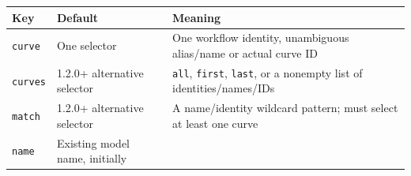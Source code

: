 \documentclass[
  10pt,
  a4paper,
  oneside]{scrreprt}
\begin{document}
\begin{longtable}[]{@{}lll@{}}
\toprule
\begin{minipage}[b]{0.30\columnwidth}\raggedright
Key\strut
\end{minipage} & \begin{minipage}[b]{0.30\columnwidth}\raggedright
Default\strut
\end{minipage} & \begin{minipage}[b]{0.30\columnwidth}\raggedright
Meaning\strut
\end{minipage}\tabularnewline
\midrule
\endhead
\begin{minipage}[t]{0.30\columnwidth}\raggedright
\texttt{curve}\strut
\end{minipage} & \begin{minipage}[t]{0.30\columnwidth}\raggedright
One selector\strut
\end{minipage} & \begin{minipage}[t]{0.30\columnwidth}\raggedright
One workflow identity, unambiguous alias/name or actual curve ID\strut
\end{minipage}\tabularnewline
\begin{minipage}[t]{0.30\columnwidth}\raggedright
\texttt{curves}\strut
\end{minipage} & \begin{minipage}[t]{0.30\columnwidth}\raggedright
1.2.0+ alternative selector\strut
\end{minipage} & \begin{minipage}[t]{0.30\columnwidth}\raggedright
\texttt{all}, \texttt{first}, \texttt{last}, or a nonempty list of
identities/names/IDs\strut
\end{minipage}\tabularnewline
\begin{minipage}[t]{0.30\columnwidth}\raggedright
\texttt{match}\strut
\end{minipage} & \begin{minipage}[t]{0.30\columnwidth}\raggedright
1.2.0+ alternative selector\strut
\end{minipage} & \begin{minipage}[t]{0.30\columnwidth}\raggedright
A name/identity wildcard pattern; must select at least one curve\strut
\end{minipage}\tabularnewline
\begin{minipage}[t]{0.30\columnwidth}\raggedright
\texttt{name}\strut
\end{minipage} & \begin{minipage}[t]{0.30\columnwidth}\raggedright
Existing model name, initially

\end{minipage}
\end{longtable}
\end{document}
